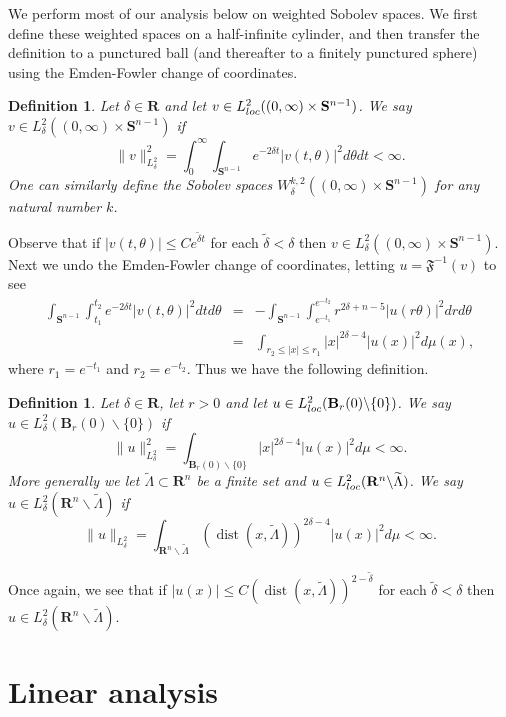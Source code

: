 \documentclass[reqno,11pt]{amsart}
\newtheorem{definition}[theorem]{Definition}
\theoremstyle{tttheorem}
\newcommand{\Ss}{\mathbf{S}}
\newcommand{\R}{\mathbf{R}}
\begin{document}
We perform most of our analysis below on weighted Sobolev 
spaces. We first define these weighted spaces on a half-infinite 
cylinder, and then transfer the definition to a punctured ball (and thereafter 
to a finitely punctured sphere) using the Emden-Fowler change of coordinates. 
\begin{definition} Let $\delta\in \R$ and let $v\in L^2_{\rm loc} 
((0,\infty) \times \Ss^{n-1})$. We say $v \in L^2_\delta ((0,\infty) 
\times \Ss^{n-1})$ if 
$$\| v\|^2_{L^2_\delta} = \int_0^\infty \int_{\Ss^{n-1}} e^{-2\delta t} 
|v(t,\theta)|^2 d\theta dt < \infty.$$
One can similarly define the Sobolev spaces $W^{k,2}_\delta ((0,\infty) 
\times \Ss^{n-1})$ for any natural number $k$. 
\end{definition} 
Observe that if $|v(t,\theta)| \leq C e^{\widetilde{\delta} t}$ for each 
$\widetilde{\delta} < \delta$ then $v\in L^2_\delta((0,\infty) \times \Ss^{n-1})$. 
Next we undo the Emden-Fowler change of coordinates, letting $u = \mathfrak{F}^{-1}(v)$ 
to see 
\begin{eqnarray*} 
\int_{\Ss^{n-1}} \int_{t_1}^{t_2} e^{-2\delta t} |v(t,\theta)|^2 dt d\theta 
& = & -\int_{\Ss^{n-1}} \int_{e^{-t_1}}^{e^{-t_2}} r^{2\delta+n-5} |u(r\theta)|^2 
dr d\theta \\ 
& = & \int_{r_2 \leq |x| \leq r_1} |x|^{2\delta - 4} |u(x)|^2 d\mu(x),
\end{eqnarray*} 
where $r_1 = e^{-t_1}$ and $r_2 = e^{-t_2}$. Thus we have the following definition. 

\begin{definition} Let $\delta\in \R$, let $r > 0$ and let $u 
\in L^2_{\rm loc} (\mathbf{B}_r(0)\backslash \{ 0 \} )$. We say $u \in 
L^2_\delta (\mathbf{B}_r(0) \backslash \{ 0 \})$ 
if $$\| u \|^2_{L^2_\delta} = \int_{\mathbf{B}_r(0) \backslash \{ 0 \}}
|x|^{2\delta - 4} |u(x)|^2 d\mu < \infty.$$
More generally we let $\widetilde \Lambda \subset \R^n$ be a finite set and 
$u \in L^2_{\rm loc} (\R^n \backslash \widetilde \Lambda)$. We 
say $u \in L^2_\delta(\R^n \backslash \widetilde \Lambda)$ if 
$$\| u\|_{L^2_\delta} = \int_{\R^n \backslash \widetilde \Lambda} 
(\operatorname{dist}(x,\widetilde \Lambda))^{2\delta - 4} |u(x)|^2 d\mu < \infty .$$
\end{definition} 
Once again, we see that if $|u(x)| \leq C(\operatorname{dist}
(x,\widetilde\Lambda))^{2-\widetilde{\delta}}$ for each $\widetilde{\delta} < \delta$ 
then $u \in L^2_\delta(\R^n \backslash \widetilde \Lambda)$.

\section{Linear analysis} \label{sec:lin_anal}
\end{document}
